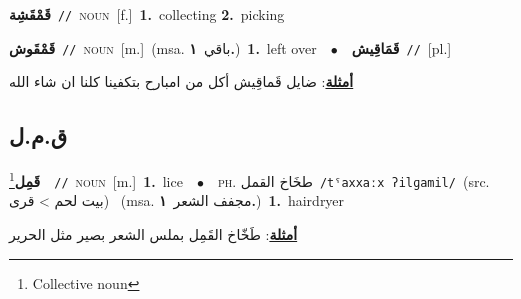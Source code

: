 \documentclass[10pt,a4paper,twoside]{article} %
\begin{document}
\begin{multicols}{2}
{\setlength\topsep{0pt}\textbf{\foreignlanguage{arabic}{قَمْقَشِة}}\ {\color{gray}\texttt{//}\color{black}}\ \textsc{noun}\ [f.]\ \textbf{1.}~collecting  \textbf{2.}~picking\ } \vspace{2mm}

{\setlength\topsep{0pt}\textbf{\foreignlanguage{arabic}{قَمْقَوش}}\ {\color{gray}\texttt{//}\color{black}}\ \textsc{noun}\ [m.]\ \color{gray}(msa. \foreignlanguage{arabic}{باقي}~\foreignlanguage{arabic}{\textbf{١.}})\color{black}\ \textbf{1.}~left over\ \ $\bullet$\ \ \setlength\topsep{0pt}\textbf{\foreignlanguage{arabic}{قَمَاقِيش}}\ {\color{gray}\texttt{//}\color{black}}\ [pl.]\  \begin{flushright}\color{gray}\foreignlanguage{arabic}{\textbf{\underline{\foreignlanguage{arabic}{أمثلة}}}: ضايل قَماقِيش أكل من امبارح بتكفينا كلنا ان شاء الله}\end{flushright}\color{black}} \vspace{2mm}

\vspace{-3mm}
\subsection*{\color{blue}\foreignlanguage{arabic}{ق.م.ل}\color{blue}{}} 

{\setlength\topsep{0pt}\textbf{\foreignlanguage{arabic}{قَمِل}}\footnote{Collective noun}\ \ {\color{gray}\texttt{//}\color{black}}\ \textsc{noun}\ [m.]\ \textbf{1.}~lice\ \ $\bullet$\ \ \textsc{ph.} \color{gray} \foreignlanguage{arabic}{طخَاخ القمل}\color{black}\ {\color{gray}\texttt{/{\sffamily tˤaxxaːx ʔilɡamil}/}\color{black}}\ \color{gray}(src. \foreignlanguage{arabic}{بيت لحم > قرى})\color{black}\ \color{gray} (msa. \foreignlanguage{arabic}{مجفف الشعر}~\foreignlanguage{arabic}{\textbf{١.}})\color{black}\ \textbf{1.}~hairdryer\  \begin{flushright}\color{gray}\foreignlanguage{arabic}{\textbf{\underline{\foreignlanguage{arabic}{أمثلة}}}: طَخّاخ القَمِل بملس الشعر بصير مثل الحرير}\end{flushright}\color{black}} \vspace{2mm}


\end{multicols}
\end{document}

